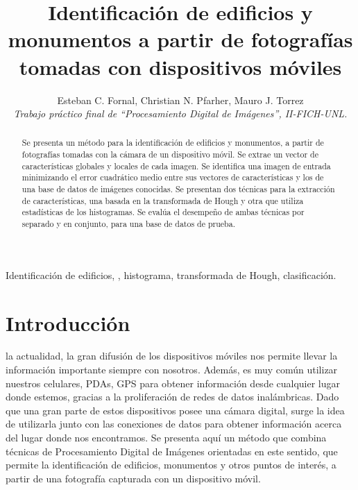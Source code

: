 \documentclass[conference,a4paper,10pt,oneside,final]{tfmpd}
\begin{document}
\title{Identificación de edificios y monumentos a partir de fotografías
tomadas con dispositivos móviles}
\author{Esteban C. Fornal, Christian N. Pfarher, Mauro J. Torrez\\
\textit{Trabajo práctico final de ``Procesamiento Digital de
Imágenes'', II-FICH-UNL.}}
\maketitle
%
%
%
%
\begin{abstract}
Se presenta un método para la identificación de edificios y monumentos, a
partir de fotografías tomadas con la cámara de un dispositivo móvil.
Se extrae un vector de características {globales y locales} de cada imagen.
{Se identifica una imagen de entrada minimizando el error cuadrático medio
entre sus vectores de características y los de una base de datos de imágenes
conocidas.}
Se presentan dos técnicas para la extracción de
características, una basada en la transformada de Hough y otra que
utiliza estadísticas de los histogramas.
Se evalúa el desempeño de ambas técnicas por separado y en
conjunto, para una base de datos de prueba.
\end{abstract}
%
%
%
%
\begin{keywords}
Identificación de edificios, ,
histograma, transformada de Hough, clasificación.
\end{keywords}
%
%
%
%
\section{Introducción}
 la actualidad, la gran difusión de los dispositivos móviles nos
permite llevar la información importante siempre con nosotros. Además, es muy
común utilizar nuestros celulares, PDAs, GPS para obtener %
información desde cualquier lugar donde estemos, gracias a la proliferación de
redes de datos inalámbricas. Dado que una gran parte de estos dispositivos
posee una cámara
digital, surge la idea de utilizarla junto con las conexiones de datos para
obtener información acerca del lugar donde nos encontramos. Se presenta aquí
un método que combina técnicas de Procesamiento Digital de Imágenes orientadas
en este sentido, que permite la
identificación de edificios, monumentos y otros puntos de interés, a partir
de una fotografía capturada con un dispositivo móvil.
%
%
%
%
\end{document}
